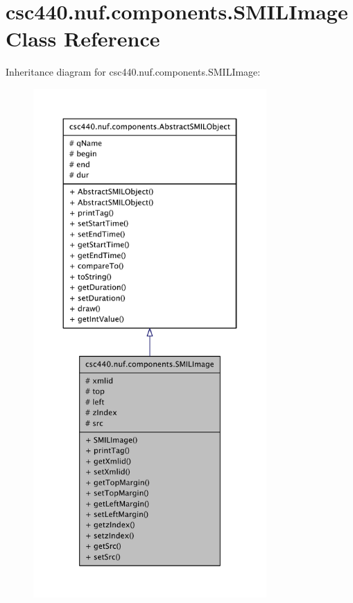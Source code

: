 \hypertarget{classcsc440_1_1nuf_1_1components_1_1_s_m_i_l_image}{\section{csc440.\-nuf.\-components.\-S\-M\-I\-L\-Image Class Reference}
\label{classcsc440_1_1nuf_1_1components_1_1_s_m_i_l_image}
}


Inheritance diagram for csc440.\-nuf.\-components.\-S\-M\-I\-L\-Image\-:
\nopagebreak
\begin{figure}[H]
\begin{center}
\leavevmode
\includegraphics[height=550pt]{classcsc440_1_1nuf_1_1components_1_1_s_m_i_l_image__inherit__graph}
\end{center}
\end{figure}


